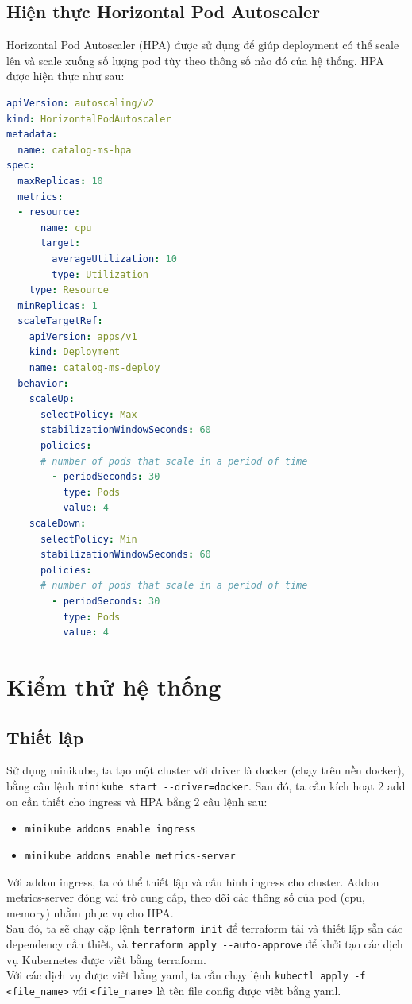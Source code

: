 \subsection{Hiện thực Horizontal Pod Autoscaler}
\noindent Horizontal Pod Autoscaler (HPA) được sử dụng để giúp deployment có thể scale lên và scale xuống số lượng pod tùy theo thông số nào đó của hệ thống. HPA được hiện thực như sau:
\begin{lstlisting}[language=yaml]
apiVersion: autoscaling/v2
kind: HorizontalPodAutoscaler
metadata:
  name: catalog-ms-hpa
spec:
  maxReplicas: 10
  metrics:
  - resource:
      name: cpu
      target:
        averageUtilization: 10
        type: Utilization
    type: Resource
  minReplicas: 1
  scaleTargetRef:
    apiVersion: apps/v1
    kind: Deployment
    name: catalog-ms-deploy
  behavior:
    scaleUp:
      selectPolicy: Max
      stabilizationWindowSeconds: 60
      policies:
      # number of pods that scale in a period of time
        - periodSeconds: 30
          type: Pods
          value: 4
    scaleDown:
      selectPolicy: Min
      stabilizationWindowSeconds: 60
      policies:
      # number of pods that scale in a period of time
        - periodSeconds: 30
          type: Pods
          value: 4
\end{lstlisting}
\section{Kiểm thử hệ thống}
\subsection{Thiết lập}
\noindent Sử dụng minikube, ta tạo một cluster với driver là docker (chạy trên nền docker), bằng câu lệnh \lstinline|minikube start --driver=docker|. Sau đó, ta cần kích hoạt 2 add on cần thiết cho ingress và HPA bằng 2 câu lệnh sau:
\begin{itemize}
  \item \lstinline|minikube addons enable ingress|
  \item \lstinline|minikube addons enable metrics-server|
\end{itemize}
Với addon ingress, ta có thể thiết lập và cấu hình ingress cho cluster. Addon metrics-server đóng vai trò cung cấp, theo dõi các thông số của pod (cpu, memory) nhằm phục vụ cho HPA.\\[0.5cm]
Sau đó, ta sẽ chạy cặp lệnh \lstinline|terraform init| để terraform tải và thiết lập sẵn các dependency cần thiết, và \lstinline|terraform apply --auto-approve| để khởi tạo các dịch vụ Kubernetes được viết bằng terraform.\\[0.5cm]
Với các dịch vụ được viết bằng yaml, ta cần chạy lệnh \lstinline|kubectl apply -f <file_name>| với \lstinline|<file_name>| là tên file config được viết bằng yaml.
